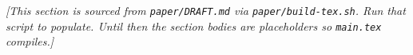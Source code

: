 \noindent\textit{[This section is sourced from \texttt{paper/DRAFT.md} via
\texttt{paper/build-tex.sh}. Run that script to populate. Until then the
section bodies are placeholders so \texttt{main.tex} compiles.]}
